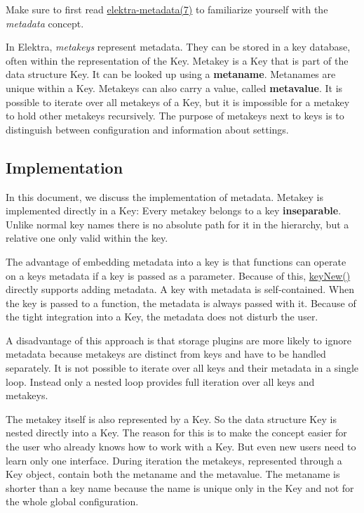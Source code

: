 Make sure to first read \hyperlink{md_doc_help_elektra-metadata_doc_help_elektra-metadata_md}{elektra-\/metadata(7)} to familiarize yourself with the {\itshape metadata} concept.

In Elektra, {\itshape metakeys} represent metadata. They can be stored in a key database, often within the representation of the {\ttfamily Key}. Metakey is a {\ttfamily Key} that is part of the data structure {\ttfamily Key}. It can be looked up using a {\bfseries metaname}. Metanames are unique within a {\ttfamily Key}. Metakeys can also carry a value, called {\bfseries metavalue}. It is possible to iterate over all metakeys of a {\ttfamily Key}, but it is impossible for a metakey to hold other metakeys recursively. The purpose of metakeys next to keys is to distinguish between configuration and information about settings.

\subsection*{Implementation}

In this document, we discuss the implementation of metadata. Metakey is implemented directly in a {\ttfamily Key}\+: Every metakey belongs to a key {\bfseries inseparable}. Unlike normal key names there is no absolute path for it in the hierarchy, but a relative one only valid within the key.

The advantage of embedding metadata into a key is that functions can operate on a key\textquotesingle{}s metadata if a key is passed as a parameter. Because of this, {\ttfamily \hyperlink{group__key_gad23c65b44bf48d773759e1f9a4d43b89}{key\+New()}} directly supports adding metadata. A key with metadata is self-\/contained. When the key is passed to a function, the metadata is always passed with it. Because of the tight integration into a {\ttfamily Key}, the metadata does not disturb the user.

A disadvantage of this approach is that storage plugins are more likely to ignore metadata because metakeys are distinct from keys and have to be handled separately. It is not possible to iterate over all keys and their metadata in a single loop. Instead only a nested loop provides full iteration over all keys and metakeys.

The metakey itself is also represented by a {\ttfamily Key}. So the data structure {\ttfamily Key} is nested directly into a {\ttfamily Key}. The reason for this is to make the concept easier for the user who already knows how to work with a {\ttfamily Key}. But even new users need to learn only one interface. During iteration the metakeys, represented through a {\ttfamily Key} object, contain both the metaname and the metavalue. The metaname is shorter than a key name because the name is unique only in the {\ttfamily Key} and not for the whole global configuration.

